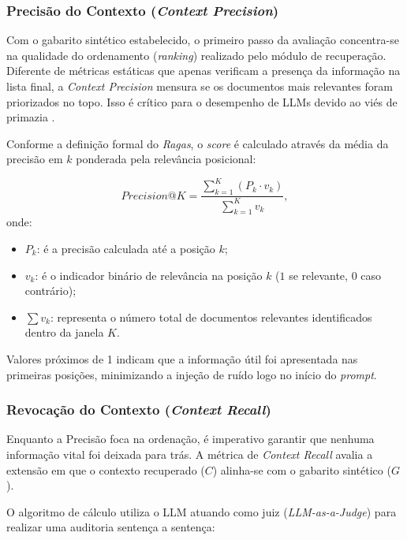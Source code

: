 \subsubsection{Precisão do Contexto (\textit{Context Precision})}

Com o gabarito sintético estabelecido, o primeiro passo da avaliação concentra-se na qualidade do ordenamento (\textit{ranking}) realizado pelo módulo de recuperação. Diferente de métricas estáticas que apenas verificam a presença da informação na lista final, a \textit{Context Precision} mensura se os documentos mais relevantes foram priorizados no topo. Isso é crítico para o desempenho de LLMs devido ao viés de primazia \citep{liu2023lostmiddlelanguagemodels}.

Conforme a definição formal do \textit{Ragas}, o \textit{score} é calculado através da média da precisão em $k$ ponderada pela relevância posicional:

\begin{equation}
  Precision@K = \frac{\sum_{k=1}^{K} (P_k \cdot v_k)}{\sum_{k=1}^{K} v_k},
\end{equation}
\noindent onde:
\begin{itemize}
  \item $P_k$: é a precisão calculada até a posição $k$;
  \item $v_k$: é o indicador binário de relevância na posição $k$ ($1$ se relevante, $0$ caso contrário);
  \item $\sum v_k$: representa o número total de documentos relevantes identificados dentro da janela $K$.
\end{itemize}

Valores próximos de 1 indicam que a informação útil foi apresentada nas primeiras posições, minimizando a injeção de ruído logo no início do \textit{prompt}.

\subsubsection{Revocação do Contexto (\textit{Context Recall})}

Enquanto a Precisão foca na ordenação, é imperativo garantir que nenhuma informação vital foi deixada para trás. A métrica de \textit{Context Recall} avalia a extensão em que o contexto recuperado ($C$) alinha-se com o gabarito sintético ($G$).

O algoritmo de cálculo utiliza o LLM atuando como juiz (\textit{LLM-as-a-Judge}) para realizar uma auditoria sentença a sentença:

